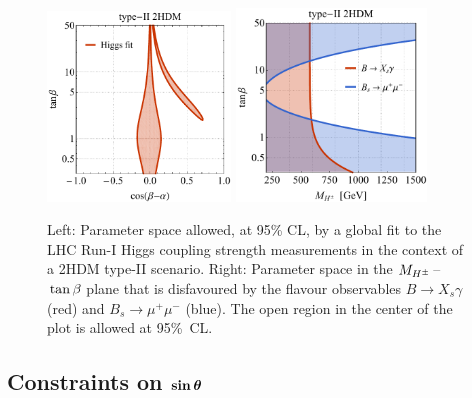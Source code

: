 \documentclass[review]{elsarticle}
\def\bm#1{\mbox{\boldmath$#1$\unboldmath}}
\begin{document}
\begin{figure}[t!]
\centering
\includegraphics[width=0.435\textwidth]{figure3l.pdf} \qquad 
\includegraphics[width=0.45\textwidth]{figure3r.pdf}
\vspace{4mm}
\caption{\label{fig:higgsflavourfit} Left: Parameter space allowed, at 95\% CL, by a global fit to the LHC Run-I Higgs coupling strength measurements in the context of a 2HDM type-II scenario. Right: Parameter space in the $M_{H^\pm}\hspace{0.5mm}$--$\hspace{0.5mm}\tan \beta$ plane that is disfavoured by the flavour observables $B \to X_s \gamma$ (red) and $B_s \to \mu^+ \mu^-$ (blue). The open region in the center of the plot is allowed at 95\%~CL. }
\end{figure}

\subsection[Constraints on $\sin \theta$]{Constraints on $\bm{\sin \theta}$}
\label{sec:EWPO}
\end{document}
